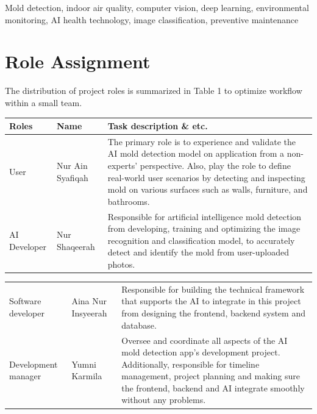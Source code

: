 \documentclass[conference]{IEEEtran}
\begin{document}
\begin{IEEEkeywords}
Mold detection, indoor air quality, computer vision, deep learning, environmental monitoring, AI health technology, image classification, preventive maintenance
\end{IEEEkeywords}

\section{Role Assignment}
The distribution of project roles is summarized in Table 1 to optimize workflow within a small team.  

\begin{table}[h]
\setlength{\tabcolsep}{12pt}
\renewcommand{\arraystretch}{1.5}
\begin{tabular}{p{1.3cm} l p{3.2cm}} \hline
Roles & Name & Task description \& etc.\\ \hline
User & Nur Ain Syafiqah & 
The primary role is to experience and validate the AI mold detection model on application from a non-experts' perspective. Also, play the role to define real-world user scenarios by detecting and inspecting mold on various surfaces such as walls, furniture, and bathrooms.\\
AI Developer & Nur Shaqeerah & Responsible for artificial intelligence mold detection from developing, training and optimizing the image recognition and classification model, to accurately detect and identify the mold from user-uploaded photos.\\

\end{tabular}
\end {table}

\begin{table}[h]
\setlength{\tabcolsep}{12pt}
\renewcommand{\arraystretch}{1.5}
\begin{tabular}{p{1.3cm} l p{3.2cm}}
Software developer & Aina Nur Insyeerah & Responsible for building the technical framework that supports the AI to integrate in this project from designing the frontend, backend system and database. \\
Development manager & Yumni Karmila & Oversee and coordinate all aspects of the AI mold detection app’s development project. Additionally, responsible for timeline management, project planning and making sure the frontend, backend and AI integrate smoothly without any problems.  \\ 
\hline
\end{tabular}
\end{table} 
\end{document}
